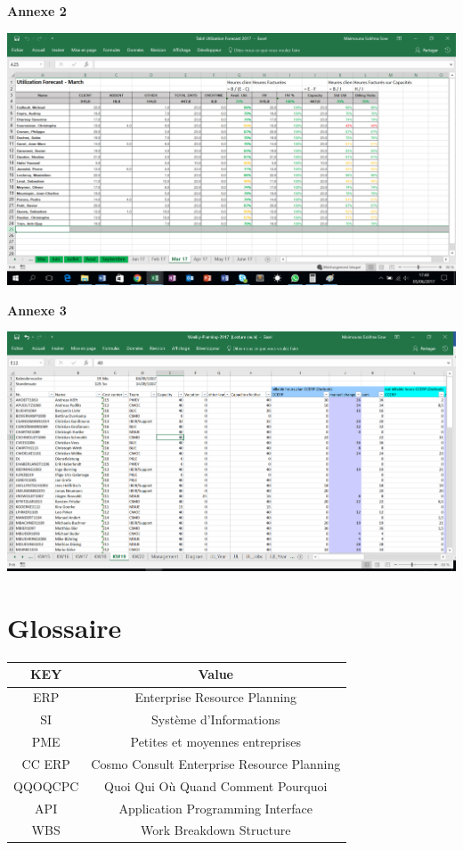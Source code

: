 \documentclass[11pt]{report}
\begin{document}
\newpage
\textbf{Annexe 2}
\begin{center}
\includegraphics[scale=0.5]{images/annexe2.png}
\end{center}

\newpage
\textbf{Annexe 3}
\begin{center}
\includegraphics[scale=0.5]{images/annexe3.png}
\end{center}

\newpage
\section{Glossaire}
\begin{tabular}{|c|c|}
\hline 
\rowcolor{green}KEY & Value \\
\hline
ERP & Enterprise Resource Planning \\ 
\hline 
SI & Système d'Informations \\ 
\hline 
PME & Petites et moyennes entreprises  \\ 
\hline 
CC ERP & Cosmo Consult Enterprise Resource Planning \\ 
\hline 
QQOQCPC & Quoi Qui Où Quand Comment Pourquoi \\ 
\hline 
API & Application Programming Interface \\ 
\hline 
WBS & Work Breakdown Structure \\ 
\hline 
\end{tabular} 
\end{document}
